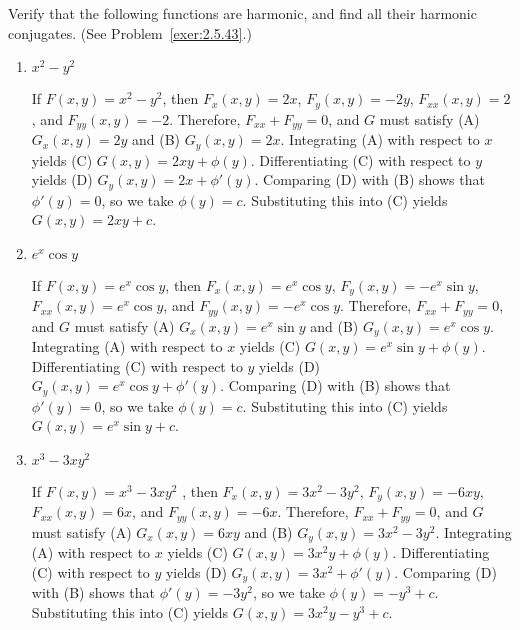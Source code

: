 \documentclass{ximera}
\begin{document}
\begin{problem}\label{exer:2.5.44}
Verify that the following functions are harmonic, and find all their harmonic conjugates.  (See Problem~\ref{exer:2.5.43}.)

\begin{enumerate}
    \item $x^2-y^2$

    

    \begin{solution}
        If $F(x,y)=x^2-y^2$, then $F_x(x,y)=2x$, $F_y(x,y)=-2y$,
$F_{xx}(x,y)=2$, and $F_{yy}(x,y)=-2$.
Therefore, $F_{xx}+F_{yy}=0$, and $G$ must satisfy
(A) $G_x(x,y)=2y$ and (B) $G_y(x,y)=2x$.
Integrating (A) with respect to $x$ yields
(C) $G(x,y)=2xy+\phi(y)$.
Differentiating
(C) with respect to
$y$ yields
(D) $G_y(x,y)=2x+\phi'(y)$.
Comparing (D) with (B)  shows that
$\phi'(y)=0$, so we take
$\phi(y)=c$.
Substituting this into (C) yields
$G(x,y)=2xy+c$.
    \end{solution}
    
    \item $e^x\cos y$

    

    \begin{solution}
        If $F(x,y)=e^x\cos y$, then $F_x(x,y)=e^x\cos y$,
 $F_y(x,y)=-e^x\sin y$,
$F_{xx}(x,y)=e^x\cos y$, and $F_{yy}(x,y)=-e^x\cos y$.
Therefore, $F_{xx}+F_{yy}=0$, and $G$ must satisfy
(A) $G_x(x,y)=e^x\sin y$ and (B) $G_y(x,y)=e^x\cos y$.
Integrating (A) with respect to $x$ yields
(C) $G(x,y)=e^x\sin y+\phi(y)$.
Differentiating (C) with respect to $y$  yields
(D) $G_y(x,y)=e^x\cos y+\phi'(y)$.
Comparing (D) with (B)  shows that
$\phi'(y)=0$, so we take
$\phi(y)=c$.
Substituting this into (C) yields
$G(x,y)=e^x\sin y+c$.
    \end{solution}
    
    \item $x^3-3xy^2$

    

    \begin{solution}
        If $F(x,y)=x^3-3xy^2$ , then $F_x(x,y)=3x^2-3y^2$, $F_y(x,y)=-6xy$,
$F_{xx}(x,y)=6x$, and $F_{yy}(x,y)=-6x$.
Therefore, $F_{xx}+F_{yy}=0$, and $G$ must satisfy
(A) $G_x(x,y)=6xy$ and (B) $G_y(x,y)=3x^2-3y^2$.
Integrating (A) with respect to $x$ yields
(C) $G(x,y)=3x^2y+\phi(y)$.
Differentiating (C) with respect to $y$  yields
(D) $G_y(x,y)=3x^2+\phi'(y)$.
Comparing (D) with (B)  shows that
$\phi'(y)=-3y^2$, so we take
$\phi(y)=-y^3+c$.
Substituting this into (C) yields
$G(x,y)=3x^2y-y^3+c$.
    \end{solution}
    

\end{enumerate}
\end{problem}
\end{document}
